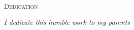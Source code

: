 \begin{center}
                \vspace{.3cm}\\
                \textsc{\Large Dedication}\\

		\vspace{2cm}
		\textit{I dedicate this humble work to my parents}


		\newpage
\end{center}


